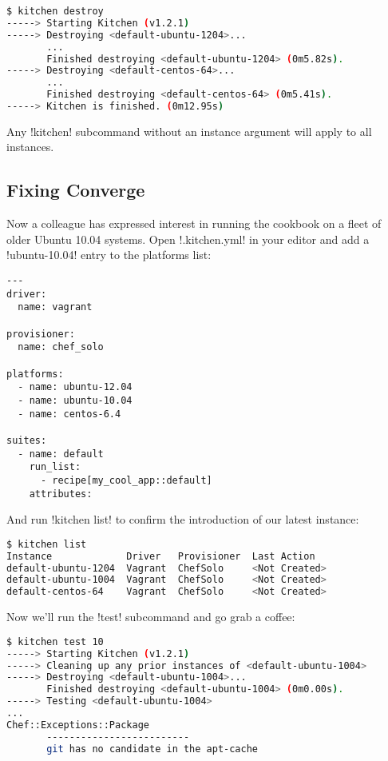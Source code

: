 \begin{lstlisting}[language=Bash,label=lst:testing-test-kitchen25]
$ kitchen destroy
-----> Starting Kitchen (v1.2.1)
-----> Destroying <default-ubuntu-1204>...
       ...
       Finished destroying <default-ubuntu-1204> (0m5.82s).
-----> Destroying <default-centos-64>...
       ...
       Finished destroying <default-centos-64> (0m5.41s).
-----> Kitchen is finished. (0m12.95s)
\end{lstlisting}

Any \inline!kitchen! subcommand without an instance argument will apply to all instances.



\subsection{Fixing Converge}

Now a colleague has expressed interest in running the cookbook on a fleet of older Ubuntu 10.04 systems. Open \inline!.kitchen.yml! in your editor and add a \inline!ubuntu-10.04! entry to the platforms list:

\begin{lstlisting}[label=lst:testing-test-kitchen26]
---
driver:
  name: vagrant

provisioner:
  name: chef_solo

platforms:
  - name: ubuntu-12.04
  - name: ubuntu-10.04
  - name: centos-6.4

suites:
  - name: default
    run_list:
      - recipe[my_cool_app::default]
    attributes:
\end{lstlisting}

And run \inline!kitchen list! to confirm the introduction of our latest instance:

\begin{lstlisting}[language=Bash,label=lst:testing-test-kitchen27]
$ kitchen list
Instance             Driver   Provisioner  Last Action
default-ubuntu-1204  Vagrant  ChefSolo     <Not Created>
default-ubuntu-1004  Vagrant  ChefSolo     <Not Created>
default-centos-64    Vagrant  ChefSolo     <Not Created>
\end{lstlisting}

Now we'll run the \inline!test! subcommand and go grab a coffee:

\begin{lstlisting}[language=Bash,label=lst:testing-test-kitchen28]
$ kitchen test 10
-----> Starting Kitchen (v1.2.1)
-----> Cleaning up any prior instances of <default-ubuntu-1004>
-----> Destroying <default-ubuntu-1004>...
       Finished destroying <default-ubuntu-1004> (0m0.00s).
-----> Testing <default-ubuntu-1004>
...
Chef::Exceptions::Package
       -------------------------
       git has no candidate in the apt-cache
\end{lstlisting}

